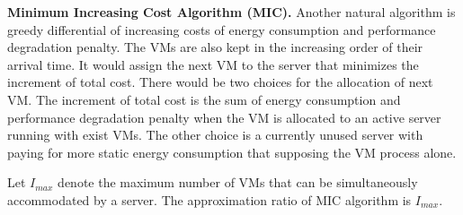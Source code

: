 \documentclass[10pt,journal]{IEEEtran}
\begin{document}
\textbf{Minimum Increasing Cost Algorithm (MIC).} Another natural algorithm is greedy differential of increasing costs of energy consumption and performance degradation penalty. The VMs are also kept in the increasing order of their arrival time. It would assign the next VM to the server that minimizes the increment of total cost. There would be two choices for the allocation of next VM. The increment of total cost is the sum of energy consumption and performance degradation penalty when the VM is allocated to an active server running with exist VMs. The other choice is a currently unused server with paying for more static energy consumption that supposing the VM process alone.
\newtheorem{lemma}{Lemma}
\begin{theorem}
Let $I_{max}$ denote the maximum number of VMs that can be simultaneously accommodated by a server. The approximation ratio of MIC algorithm is $I_{max}$. \label{theorem:approximation}
\end{theorem}
\end{document}
